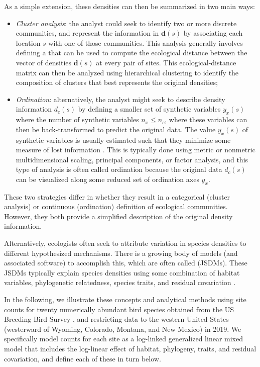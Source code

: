 As a simple extension, these densities can then be summarized in two main ways:
\begin{itemize}
    \item {}\textit{Cluster analysis}:  the analyst could seek to identify two or more discrete communities, and represent the information in \(\mathbf{d}(s)\) by associating each location \(s\) with one of those communities.  This analysis generally involves defining a  that can be used to compute the ecological distance between the vector of densities \( \mathbf{d}(s) \) at every pair of sites.  This ecological-distance matrix can then be analyzed using hierarchical clustering to identify the composition of clusters that best represents the original densities;

    \item {}\textit{Ordination}:  alternatively, the analyst might seek to describe density information \( d_c(s) \) by defining a smaller set of synthetic variables \( y_x(s) \) where the number of synthetic variables \( n_x \leq n_c \), where these variables can then be back-transformed to predict the original data.  The value \( y_x(s) \) of synthetic variables is usually estimated such that they minimize some measure of lost information \cite{mccune_analysis_2002}.  This is typically done using metric or nonmetric multidimensional scaling, principal components, or factor analysis, and this type of analysis is often called ordination because the original data \( d_c(s) \) can be visualized along some reduced set of ordination axes \( y_x \).  
\end{itemize}
These two strategies differ in whether they result in a categorical  (cluster analysis) or continuous (ordination) definition of ecological communities.  However, they both provide a simplified description of the original density information.   

Alternatively, ecologists often seek to attribute variation in species densities to different hypothesized mechanisms.  There is a growing body of models (and associated software) to accomplish this, which are often called  (JSDMs).  These JSDMs typically explain species densities using some combination of habitat variables, phylogenetic relatedness,  species traits, and residual covariation \cite{clark_why_2016,ovaskainen_how_2017,thorson_spatial_2015}. 

In the following, we illustrate these concepts and analytical methods using site counts for twenty numerically abundant bird species obtained from the US Breeding Bird Survey \cite{sauer_north_1997}, and restricting data to the western United States (westerward of Wyoming, Colorado, Montana, and New Mexico) in 2019.  We specifically model counts for each site as a log-linked generalized linear mixed model that includes the log-linear effect of habitat, phylogeny, traits, and residual covariation, and define each of these in turn below.

